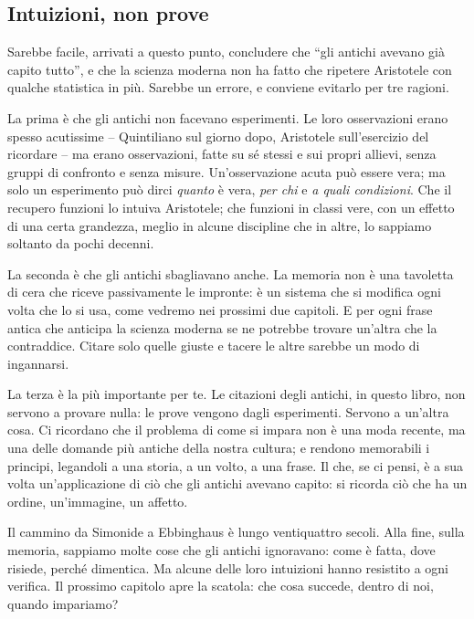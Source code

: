 \subsection*{Intuizioni, non prove}

Sarebbe facile, arrivati a questo punto, concludere che \enquote{gli
antichi avevano già capito tutto}, e che la scienza moderna non ha
fatto che ripetere Aristotele con qualche statistica in più. Sarebbe un
errore, e conviene evitarlo per tre ragioni.

La prima è che gli antichi non facevano esperimenti. Le loro
osservazioni erano spesso acutissime -- Quintiliano sul giorno dopo,
Aristotele sull'esercizio del ricordare -- ma erano osservazioni, fatte
su sé stessi e sui propri allievi, senza gruppi di confronto e senza
misure. Un'osservazione acuta può essere vera; ma solo un esperimento
può dirci \emph{quanto} è vera, \emph{per chi} e \emph{a quali
condizioni}. Che il recupero funzioni lo intuiva Aristotele; che
funzioni in classi vere, con un effetto di una certa grandezza, meglio
in alcune discipline che in altre, lo sappiamo soltanto da pochi
decenni.

La seconda è che gli antichi sbagliavano anche. La memoria non è una
tavoletta di cera che riceve passivamente le impronte: è un sistema
che si modifica ogni volta che lo si usa, come vedremo nei prossimi due
capitoli. E per ogni frase antica che anticipa la scienza moderna se ne
potrebbe trovare un'altra che la contraddice. Citare solo quelle giuste
e tacere le altre sarebbe un modo di ingannarsi.

La terza è la più importante per te. Le citazioni degli antichi, in
questo libro, non servono a provare nulla: le prove vengono dagli
esperimenti. Servono a un'altra cosa. Ci ricordano che il problema di
come si impara non è una moda recente, ma una delle domande più antiche
della nostra cultura; e rendono memorabili i principi, legandoli a una
storia, a un volto, a una frase. Il che, se ci pensi, è a sua volta
un'applicazione di ciò che gli antichi avevano capito: si ricorda ciò
che ha un ordine, un'immagine, un affetto.

\asterismo

Il cammino da Simonide a Ebbinghaus è lungo ventiquattro secoli. Alla
fine, sulla memoria, sappiamo molte cose che gli antichi ignoravano:
come è fatta, dove risiede, perché dimentica. Ma alcune delle loro
intuizioni hanno resistito a ogni verifica. Il prossimo capitolo apre
la scatola: che cosa succede, dentro di noi, quando impariamo?

